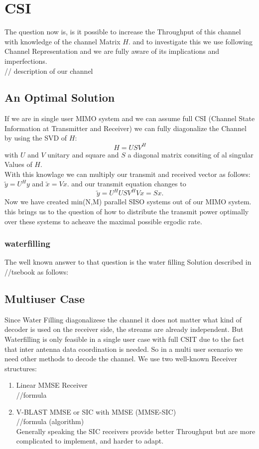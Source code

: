\documentclass[9pt,draft]{report}
\begin{document}
\chapter{CSI}
The question now is, is it possible to increase the Throughput of this channel with knowledge of the channel Matrix $H$. and to investigate this we use following Channel Representation and we are fully aware of its implications and imperfections.
\\// description of our channel

\section{An Optimal Solution}
If we are in single user MIMO system and we can assume full CSI (Channel State Information at Transmitter and Receiver) we can fully diagonalize the Channel by using the SVD of $H$:
$$
	H = USV^H
$$
with $U$ and $V$ unitary and square and $S$ a diagonal matrix consiting of al singular Values of $H$.\\
With this knowlage we can multiply our transmit and received vector as follows: $\tilde{y} = U^Hy $ and $ \tilde{x} = Vx$. and our transmit equation changes to 
$$
	\tilde{y} = U^HUSV^HVx = Sx.
$$
Now we have created min(N,M) parallel SISO systems out of our MIMO system. this brings us to the question of how to distribute the transmit power optimally over these systems to acheave the maximal possible ergodic rate.
\subsection{waterfilling}
The well known answer to that question is the water filling Solution described in //tsebook as follows:
 
 \section{Multiuser Case}
Since Water Filling diagonalizese the channel it does not matter what kind of decoder is used on the receiver side, the streams are already independent. But Waterfilling is only feasible in a single user case with full CSIT due to the fact that inter antenna data coordination is needed. So in a multi user scenario we need other methods to decode the channel.
We use two well-known Receiver structures:
\begin{enumerate}
	\item Linear MMSE Receiver\\
	//formula
	\item V-BLAST MMSE or SIC with MMSE (MMSE-SIC)\\
	//formula (algorithm)\\
	Generally speaking the SIC receivers provide better Throughput but are more complicated to implement, and harder to adapt.
\end{enumerate}
\end{document}
